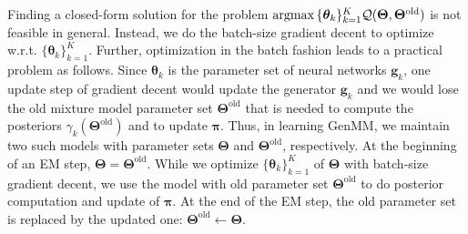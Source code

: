 Finding a closed-form solution for the problem $\operatorname{argmax}{\{\bm{\theta}_k\}_{k=1}^{K}}{ \mathcal{Q} (\bm{\Theta},\bm{\Theta}^{\mathrm{old}})}$ is not feasible in general. Instead, we do the batch-size gradient decent to optimize w.r.t. $\{\bm{\theta}_k\}_{k=1}^{K}$.
Further, optimization in the batch fashion leads to a practical problem as follows. 
Since $\bm{\theta}_k$ is the parameter set of neural networks $\bm{g}_k$, one update step of gradient decent would update the generator $\bm{g}_k$ and we would lose the old mixture model parameter set $\bm{\Theta}^{\mathrm{old}}$ that is needed to compute the posteriors $\gamma_k(\bm{\Theta}^{\mathrm{old}})$ and to update $\bm{\pi}$. Thus, in learning GenMM, we maintain two such models with parameter sets $\bm{\Theta}$ and $\bm{\Theta}^{\mathrm{old}}$, respectively. At the beginning of an EM step, $\bm{\Theta} = \bm{\Theta}^{\mathrm{old}}$. While we optimize $\{\bm{\theta}_k\}_{k=1}^{K}$ of $\bm{\Theta}$ with batch-size gradient decent, we use the model with old parameter set $\bm{\Theta}^{\mathrm{old}}$ to do posterior computation and update of $\bm{\pi}$. At the end of the EM step, the old parameter set is replaced by the updated one: $\bm{\Theta}^{\mathrm{old}}\gets \bm{\Theta}$.


